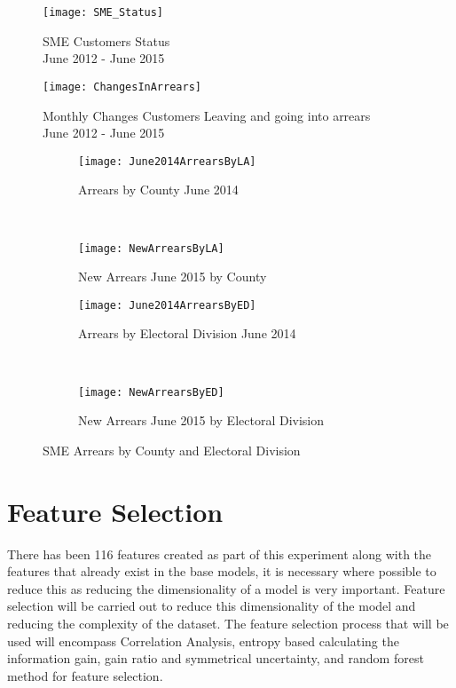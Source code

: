 \begin{figure}[H]
	\texttt{[image: SME\_Status]}
	\caption{SME Customers Status\\ June 2012 - June 2015}
	\label{fig:SME_Status}
\end{figure}

\begin{figure}[H]
	\texttt{[image: ChangesInArrears]}
	\caption{Monthly Changes Customers Leaving and going into arrears\\June 2012 - June 2015}
	\label{fig:ChangesInArrears}
\end{figure}


\begin{figure}[H]
	\begin{subfigure}[b]{0.45\textwidth}
		\captionsetup{font=scriptsize}
		\texttt{[image: June2014ArrearsByLA]}
		\caption{Arrears by County June 2014}\label{fig:June2014ArrearsByLA}
	\end{subfigure} ~\quad
	\begin{subfigure}[b]{0.45\textwidth}
		\captionsetup{font=scriptsize}
		\texttt{[image: NewArrearsByLA]}
		\caption{New Arrears June 2015 by County}\label{fig:NewArrearsByLA}
	\end{subfigure}
	\medskip \newline
	\begin{subfigure}[b]{0.45\textwidth}
		\captionsetup{font=scriptsize}
		\texttt{[image: June2014ArrearsByED]}
		\caption{Arrears by Electoral Division June 2014}
		\label{fig:June2014ArrearsByED}
	\end{subfigure}  ~\quad
	\begin{subfigure}[b]{0.45\textwidth}
		\captionsetup{font=scriptsize}
		\texttt{[image: NewArrearsByED]}
		\caption{New Arrears June 2015 by Electoral Division}
		\label{fig:NewArrearsByED}
	\end{subfigure}
	\caption{SME Arrears by County and Electoral Division}
	\label{fig:SMEArrearsLAED}
\end{figure}



\section{Feature Selection}
There has been 116 features created as part of this experiment along with the features that already exist in the base models, it is necessary where possible to reduce this as reducing the dimensionality of a model is very important. Feature selection will be carried out to reduce this dimensionality of the model and reducing the complexity of the dataset. The feature selection process that will be used will encompass Correlation Analysis, entropy based calculating the information gain, gain ratio and symmetrical uncertainty, and random forest method for feature selection. 


